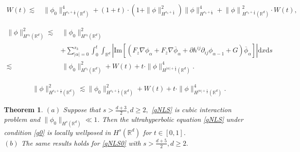\documentclass[10pt,a4paper]{amsart}
\newtheorem{thm}{Theorem}
\def\geq{\geqslant}
\begin{document}
\begin{align}  \label{cenerM}
	W(t) 
	\lesssim &\,  \|\phi_0\|^4_{H^{s_3+\frac 12}(\mathbb{R}^{d})} +  (1+t)\cdot\left(1+\|\phi\|_{H^{s_3+\frac 12}}^2\right)\|\phi\|_{H^{s_3+\frac 12}}^4+\left\|  \phi\right\|_{H^{s_3+\frac 12}(\mathbb{R}^d)}^2 \cdot W (t),
\end{align}

\begin{align} \label{cener1}
	\| \phi\|_{H^{ s_3 }(\mathbb{R}^d)}^2\lesssim &\, 		\| \phi_0\|_{H^{s_3 }(\mathbb{R}^d)}^2\nonumber\\
	&+\sum_{|\alpha|=0}^{s_3}\int_0^t\int_{\mathbb{R}^d} \left| \mathrm{Im} \left[  \left(F_z\nabla \phi_\alpha+F_{\overline{z}}\nabla \overline{\phi}_\alpha+\partial h^{ij}\partial_{ij } \phi_{\alpha -1}+G\right)\overline{\phi}_{\alpha }\right]\right| \mathrm{d} x\mathrm{d} s\\
	\lesssim &\,\| \phi_0\|_{H^{s_3 }(\mathbb{R}^d)}^2+W(t)+t\cdot\|\phi\|_{H^{|\alpha|+\frac12}(\mathbb{R}^{d})}^4. \nonumber
\end{align}

\begin{align}\label{cener3}
	&	\|\phi\|_{H^{s_3+\frac12}(\mathbb{R}^{d})}^2\lesssim 	\|\phi_0\|_{H^{s_3+\frac12}(\mathbb{R}^{d})}^2+ W(t)+t\cdot\|\phi\|_{H^{|\alpha|+\frac12}(\mathbb{R}^{d})}^4.
\end{align}

\begin{thm} \label{thm3}
	$ 	(a) $   Suppose that $  s>\frac {d+3}2, d \geq 2,   $   \eqref{qNLS} is  cubic interaction problem and $ \|\phi_0\|_{H^s(\mathbb{R}^d)}\ll 1 $. Then the ultrahyperbolic equation \eqref{qNLS} under condition   \eqref{g0}  is locally wellposed in $ H^s(\mathbb{R}^d) $  for $t\in  [0,1] $.\\
	$ (b) $ The same results holds for \eqref{qNLS0} with $ s>\frac{d+5}{2}, d\geq 2. $
\end{thm}
\end{document}
